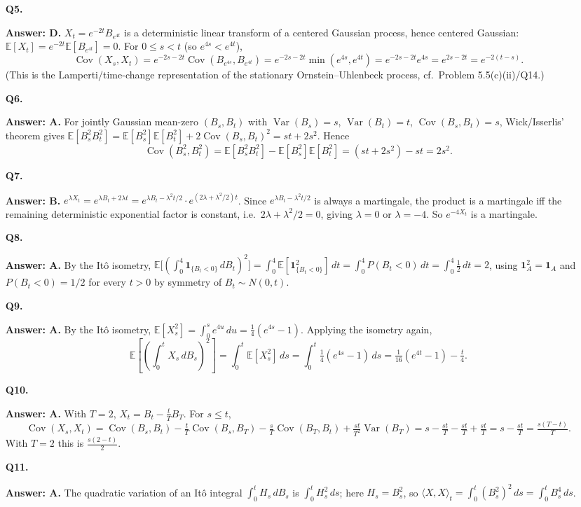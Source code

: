 \documentclass[11pt]{article}
\newcommand{\E}{\mathbb{E}}
\DeclareMathOperator{\Var}{Var}
\DeclareMathOperator{\Cov}{Cov}
\newcommand{\ans}[1]{\par\noindent\textbf{\color{blue!50!black}Answer: #1}}
\begin{document}
\begin{enumerate}
\item[\textbf{Q5.}] \ans{D.} $X_t=e^{-2t}B_{e^{4t}}$ is a deterministic linear transform of a centered Gaussian process, hence centered Gaussian: $\E[X_t]=e^{-2t}\E[B_{e^{4t}}]=0$. For $0\le s<t$ (so $e^{4s}<e^{4t}$),
\[
\Cov(X_s,X_t)=e^{-2s-2t}\Cov(B_{e^{4s}},B_{e^{4t}})=e^{-2s-2t}\min(e^{4s},e^{4t})=e^{-2s-2t}e^{4s}=e^{2s-2t}=e^{-2(t-s)}.
\]
(This is the Lamperti/time-change representation of the stationary Ornstein--Uhlenbeck process, cf.\ Problem 5.5(c)(ii)/Q14.)

\item[\textbf{Q6.}] \ans{A.} For jointly Gaussian mean-zero $(B_s,B_t)$ with $\Var(B_s)=s$, $\Var(B_t)=t$, $\Cov(B_s,B_t)=s$, Wick/Isserlis' theorem gives $\E[B_s^2B_t^2]=\E[B_s^2]\E[B_t^2]+2\Cov(B_s,B_t)^2=st+2s^2$. Hence
\[
\Cov(B_s^2,B_t^2)=\E[B_s^2B_t^2]-\E[B_s^2]\E[B_t^2]=(st+2s^2)-st=2s^2.
\]

\item[\textbf{Q7.}] \ans{B.} $e^{\lambda X_t}=e^{\lambda B_t+2\lambda t}=e^{\lambda B_t-\lambda^2t/2}\cdot e^{(2\lambda+\lambda^2/2)t}$. Since $e^{\lambda B_t-\lambda^2t/2}$ is always a martingale, the product is a martingale iff the remaining deterministic exponential factor is constant, i.e.\ $2\lambda+\lambda^2/2=0$, giving $\lambda=0$ or $\lambda=-4$. So $e^{-4X_t}$ is a martingale.

\item[\textbf{Q8.}] \ans{A.} By the Itô isometry, $\E\big[(\int_0^4\mathbf1_{\{B_t<0\}}\,dB_t)^2\big]=\int_0^4\E[\mathbf1_{\{B_t<0\}}^2]\,dt=\int_0^4P(B_t<0)\,dt=\int_0^4\tfrac12\,dt=2$, using $\mathbf1_A^2=\mathbf1_A$ and $P(B_t<0)=1/2$ for every $t>0$ by symmetry of $B_t\sim N(0,t)$.

\item[\textbf{Q9.}] \ans{A.} By the Itô isometry, $\E[X_s^2]=\int_0^se^{4u}\,du=\tfrac14(e^{4s}-1)$. Applying the isometry again,
\[
\E\left[\left(\int_0^tX_s\,dB_s\right)^2\right]=\int_0^t\E[X_s^2]\,ds=\int_0^t\tfrac14(e^{4s}-1)\,ds=\tfrac1{16}(e^{4t}-1)-\tfrac t4.
\]

\item[\textbf{Q10.}] \ans{A.} With $T=2$, $X_t=B_t-\tfrac tT B_T$. For $s\le t$,
\[
\Cov(X_s,X_t)=\Cov(B_s,B_t)-\tfrac tT\Cov(B_s,B_T)-\tfrac sT\Cov(B_T,B_t)+\tfrac{st}{T^2}\Var(B_T)=s-\tfrac{st}T-\tfrac{st}T+\tfrac{st}T=s-\tfrac{st}T=\tfrac{s(T-t)}T.
\]
With $T=2$ this is $\tfrac{s(2-t)}2$.

\item[\textbf{Q11.}] \ans{A.} The quadratic variation of an Itô integral $\int_0^tH_s\,dB_s$ is $\int_0^tH_s^2\,ds$; here $H_s=B_s^2$, so $\langle X,X\rangle_t=\int_0^t(B_s^2)^2\,ds=\int_0^tB_s^4\,ds$.


\end{enumerate}
\end{document}
